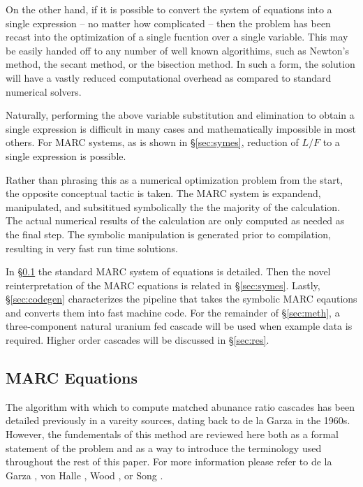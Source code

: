 \documentclass[preprint,12pt]{elsarticle}
\begin{document}
On the other hand, if it is possible to convert the system of equations 
into a single expression -- no matter how complicated -- then the problem has been 
recast into the optimization of a single fucntion over a single variable.   This 
may be easily handed off to any number of well known algorithims, such as Newton's
method, the secant method, or the bisection method.  In such a form, the solution 
will have a vastly reduced computational overhead as compared to standard 
numerical solvers. 

Naturally, performing the above variable substitution and elimination to obtain a 
single expression is difficult in many cases and mathematically impossible in most 
others.  For MARC systems, as is shown in \S \ref{sec:symes}, reduction of $L/F$
to a single expression is possible.

Rather than phrasing this as a numerical optimization problem from the start, the 
opposite conceptual tactic is taken.  The MARC system is expandend, manipulated, 
and subsititued symbolically the the majority of the calculation.  The actual 
numerical results of the calculation are only computed as needed as the final step.
The symbolic manipulation is generated prior to compilation, resulting in 
very fast run time solutions.

In \S \ref{sec:marceq} the standard MARC system of equations is detailed. 
Then the novel reinterpretation of the MARC equations is related in 
\S \ref{sec:symes}.  
Lastly, \S \ref{sec:codegen} characterizes the pipeline that takes the symbolic MARC 
eqautions and converts them into fast machine code.  
For the remainder of \S \ref{sec:meth}, a three-component natural uranium fed 
cascade will be used when example data is required.
Higher order cascades will be discussed in \S \ref{sec:res}.

\subsection{MARC Equations}
\label{sec:marceq}
The algorithm with which to compute matched abunance ratio cascades has been 
detailed previously in a vareity sources, dating back to de la Garza in the
1960s. However, the fundementals of this method are reviewed here both as a formal
statement of the problem and as a way to introduce the terminology used throughout 
the rest of this paper.  For more information please refer to de la Garza
\cite{DelaGarza1969}, von Halle \cite{VonHalle1987}, Wood \cite{Wood1999}, or 
Song \cite{doi:10.1080/01496391003793884}.
\end{document}
